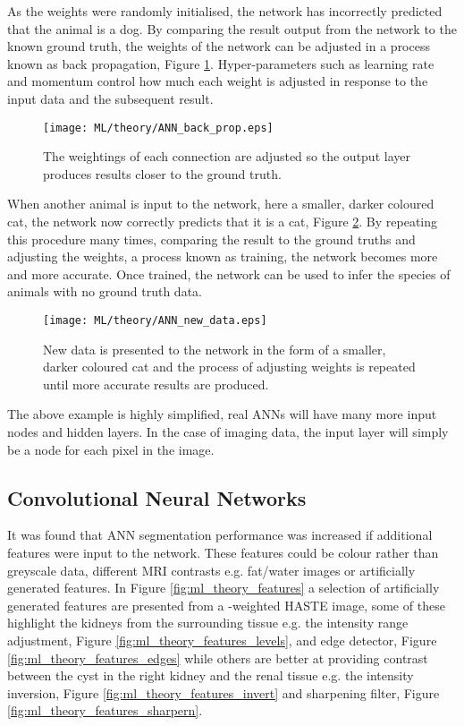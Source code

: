 As the weights were randomly initialised, the network has incorrectly predicted that the animal is a dog. By comparing the result output from the network to the known ground truth, the weights of the network can be adjusted in a process known as back propagation, Figure \ref{fig:ml_theory_adjusted}. Hyper-parameters such as learning rate and momentum control how much each weight is adjusted in response to the input data and the subsequent result.

\begin{figure}[H]
	\centering
	\texttt{[image: ML/theory/ANN\_back\_prop.eps]}
	\caption{The weightings of each connection are adjusted so the output layer produces results closer to the ground truth.}
	\label{fig:ml_theory_adjusted}	
\end{figure}

When another animal is input to the network, here a smaller, darker coloured cat, the network now correctly predicts that it is a cat, Figure \ref{fig:ml_theory_new_data}. By repeating this procedure many times, comparing the result to the ground truths and adjusting the weights, a process known as training, the network becomes more and more accurate. Once trained, the network can be used to infer the species of animals with no ground truth data.

\begin{figure}[H]
	\centering
	\texttt{[image: ML/theory/ANN\_new\_data.eps]}
	\caption{New data is presented to the network in the form of a smaller, darker coloured cat and the process of adjusting weights is repeated until more accurate results are produced.}
	\label{fig:ml_theory_new_data}	
\end{figure}

The above example is highly simplified, real \ac{ANN}s will have many more input nodes and hidden layers. In the case of imaging data, the input layer will simply be a node for each pixel in the image.

\subsection{Convolutional Neural Networks}

It was found that \ac{ANN} segmentation performance was increased if additional features were input to the network. These features could be colour rather than greyscale data, different \ac{MRI} contrasts e.g. fat/water images or artificially generated features. In Figure \ref{fig:ml_theory_features} a selection of artificially generated features are presented from a \ttwo-weighted \ac{HASTE} image, some of these highlight the kidneys from the surrounding tissue e.g. the intensity range adjustment, Figure \ref{fig:ml_theory_features_levels}, and edge detector, Figure \ref{fig:ml_theory_features_edges} while others are better at providing contrast between the cyst in the right kidney and the renal tissue e.g. the intensity inversion, Figure \ref{fig:ml_theory_features_invert} and sharpening filter, Figure \ref{fig:ml_theory_features_sharpern}.

